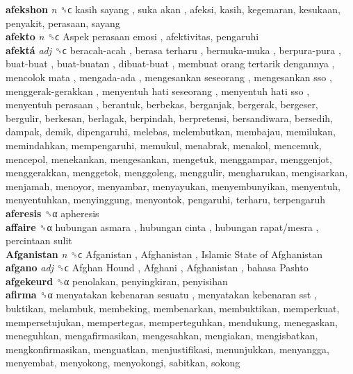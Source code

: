 \textbf{afekshon} \emph{n}  ␝ϲ   kasih sayang ,  suka akan , afeksi, kasih, kegemaran, kesukaan, penyakit, perasaan, sayang  \\
\textbf{afekto} \emph{n}  ␝ϲ   Aspek perasaan emosi , afektivitas, pengaruhi  \\
\textbf{afektá} \emph{adj}  ␝ϲ   beracah-acah ,  berasa terharu ,  bermuka-muka ,  berpura-pura ,  buat-buat ,  buat-buatan ,  dibuat-buat ,  membuat orang tertarik dengannya ,  mencolok mata ,  mengada-ada ,  mengesankan seseorang ,  mengesankan sso ,  menggerak-gerakkan ,  menyentuh hati seseorang ,  menyentuh hati sso ,  menyentuh perasaan , berantuk, berbekas, berganjak, bergerak, bergeser, bergulir, berkesan, berlagak, berpindah, berpretensi, bersandiwara, bersedih, dampak, demik, dipengaruhi, melebas, melembutkan, membajau, memilukan, memindahkan, mempengaruhi, memukul, menabrak, menakol, mencemuk, mencepol, menekankan, mengesankan, mengetuk, menggampar, menggenjot, menggerakkan, menggetok, menggoleng, menggulir, mengharukan, mengisarkan, menjamah, menoyor, menyambar, menyayukan, menyembunyikan, menyentuh, menyentuhkan, menyinggung, menyontok, pengaruhi, terharu, terpengaruh  \\
\textbf{aferesis} ␝α  apheresis  \\
\textbf{affaire} ␝α   hubungan asmara ,  hubungan cinta ,  hubungan rapat/mesra ,  percintaan sulit   \\
\textbf{Afganistan} \emph{n}  ␝ϲ   Afganistan ,  Afghanistan ,  Islamic State of Afghanistan   \\
\textbf{afgano} \emph{adj}  ␝ϲ   Afghan Hound ,  Afghani ,  Afghanistan ,  bahasa Pashto   \\
\textbf{afgekeurd} ␝α  penolakan, penyingkiran, penyisihan  \\
\textbf{afirma} ␝α   menyatakan kebenaran sesuatu ,  menyatakan kebenaran sst , buktikan, melambuk, membeking, membenarkan, membuktikan, memperkuat, mempersetujukan, mempertegas, memperteguhkan, mendukung, menegaskan, meneguhkan, mengafirmasikan, mengesahkan, mengiakan, mengisbatkan, mengkonfirmasikan, menguatkan, menjustifikasi, menunjukkan, menyangga, menyembat, menyokong, menyokongi, sabitkan, sokong  \\

